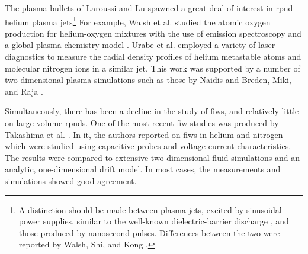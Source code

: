 The plasma bullets of Laroussi and Lu spawned a great deal of interest in
\acs{rpnd} helium plasma jets\footnote{A distinction should be made between
plasma jets, excited by sinusoidal power supplies, similar to the well-known
dielectric-barrier discharge \cite{Kogelschatz2003}, and those produced by
nanosecond pulses. Differences between the two were reported by Walsh, Shi, and
Kong \cite{Walsh2006}.} For example, Walsh et al. studied the atomic oxygen
production for helium-oxygen mixtures with the use of emission spectroscopy and
a global plasma chemistry model \cite{Walsh2010}. Urabe et al. employed a
variety of laser diagnostics to measure the radial density profiles of helium
metastable atoms and molecular nitrogen ions in a similar jet. This work was
supported by a number of two-dimensional plasma simulations such as those by
Naidis \cite{Naidis2010} and Breden, Miki, and Raja \cite{Breden2011}.

Simultaneously, there has been a decline in the study of \acs{fiw}s, and
relatively little on large-volume \acs{rpnd}s. One of the most recent \acs{fiw}
studies was produced by Takashima et al. \cite{Takashima2011}. In it, the
authors reported on \acs{fiw}s in helium and nitrogen which were studied using
capacitive probes and voltage-current characteristics. The results were compared
to extensive two-dimensional fluid simulations and an analytic, one-dimensional
drift model. In most cases, the measurements and simulations showed good
agreement.

